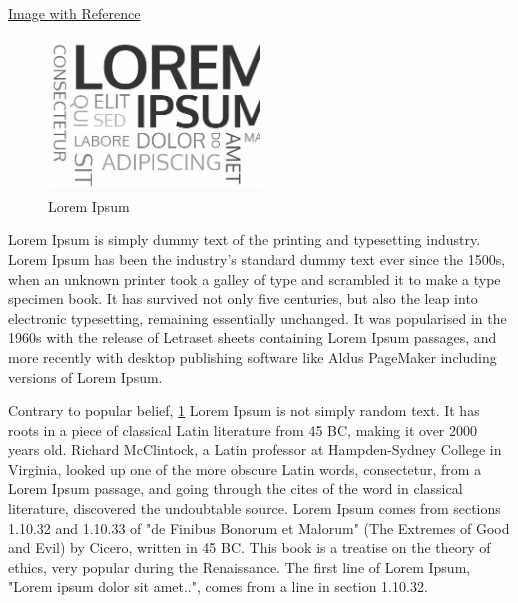 \documentclass{article}
\begin{document}
\begin{center}
    \Large \underline {Image with Reference}
\end{center}

\begin{figure}[h]
    \centering
    \includegraphics[width=0.5\textwidth]{Lorem}
    \caption{Lorem Ipsum} %
    \label{fig:Lorem1} %
\end{figure}
Lorem Ipsum is simply dummy text of the printing and typesetting industry. Lorem Ipsum has been the industry's standard dummy text ever since the 1500s, when an unknown printer took a galley of type and scrambled it to make a type specimen book. It has survived not only five centuries, but also the leap into electronic typesetting, remaining essentially unchanged. It was popularised in the 1960s with the release of Letraset sheets containing Lorem Ipsum passages, and more recently with desktop publishing software like Aldus PageMaker including versions of Lorem Ipsum.

Contrary to popular belief, \ref{fig:Lorem1} Lorem Ipsum is not simply random text. It has roots in a piece of classical Latin literature from 45 BC, making it over 2000 years old. Richard McClintock, a Latin professor at Hampden-Sydney College in Virginia, looked up one of the more obscure Latin words, consectetur, from a Lorem Ipsum passage, and going through the cites of the word in classical literature, discovered the undoubtable source. Lorem Ipsum comes from sections 1.10.32 and 1.10.33 of "de Finibus Bonorum et Malorum" (The Extremes of Good and Evil) by Cicero, written in 45 BC. This book is a treatise on the theory of ethics, very popular during the Renaissance. The first line of Lorem Ipsum, "Lorem ipsum dolor sit amet..", comes from a line in section 1.10.32.
\end{document}
